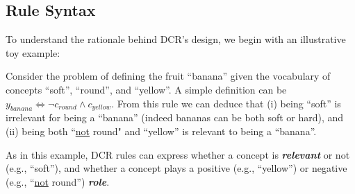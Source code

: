 \subsection{Rule Syntax}
\label{sec:rulepred}
To understand the rationale behind DCR's design, we begin with an illustrative toy example:
\begin{example}
\label{ex:banana}
Consider the problem of defining the fruit ``banana'' given the vocabulary of concepts ``soft'', ``round'', and ``yellow''. A simple definition can be $y_{\textit{banana}} \Leftrightarrow \neg c_{\textit{round}} \land c_{\textit{yellow}}$. From this rule we can deduce that (i) being ``soft'' is irrelevant for being a ``banana'' (indeed bananas can be both soft or hard), and (ii) being both ``\underline{not} round" and ``yellow'' is relevant to being a ``banana''.
\end{example}
As in this example, DCR rules can express whether a concept is \textbf{\emph{relevant}} or not (e.g., ``soft''), and whether a concept plays a positive (e.g., ``yellow'') or negative (e.g., ``\underline{not} round'') \textbf{\emph{role}}. 
